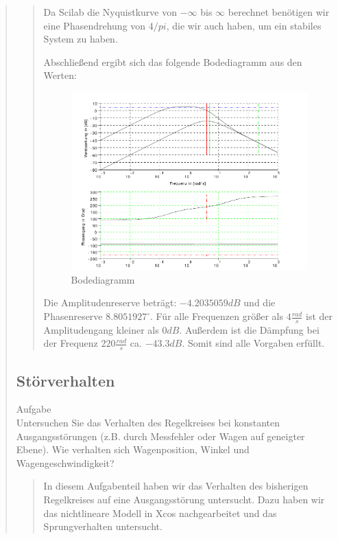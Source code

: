 \begin{quote}
\begin{quote}
        Da Scilab die Nyquistkurve von $-\infty$ bis $\infty$ berechnet benötigen wir eine Phasendrehung von $4/pi$, die
        wir auch haben, um ein stabiles System zu haben.\vspace{1em}
        
        Abschließend ergibt sich das folgende Bodediagramm aus den Werten:
        
        \begin{figure}[H]
        \centering
            \includegraphics[scale=0.7, trim = 0cm 0cm 0cm 0cm, clip]{./Bilder/Bodediagramm}
                \caption{Bodediagramm}
        \end{figure}
        
        Die Amplitudenreserve beträgt: $-4.2035059 dB$ und die Phasenreserve $8.8051927 ^{\circ}$. Für alle Frequenzen
        größer als $4\frac{rad}{s}$ ist der Amplitudengang kleiner als $0dB$. Außerdem ist die Dämpfung bei der Frequenz
        $220 \frac{rad}{s}$ ca. $-43.3 dB$. Somit sind alle Vorgaben erfüllt. 
    
    \end{quote}  %
    
    \subsection{Störverhalten}
    Aufgabe\\
    Untersuchen Sie das Verhalten des Regelkreises bei konstanten Ausgangsstörungen (z.B. durch Messfehler oder Wagen
    auf geneigter Ebene). Wie verhalten sich Wagenposition, Winkel und Wagengeschwindigkeit?
    \begin{quote}
        In diesem Aufgabenteil haben wir das Verhalten des bisherigen Regelkreises auf eine Ausgangsstörung untersucht.
        Dazu haben wir das nichtlineare Modell in Xcos nachgearbeitet und das Sprungverhalten untersucht.
    \end{quote}  %
    

\end{quote}
